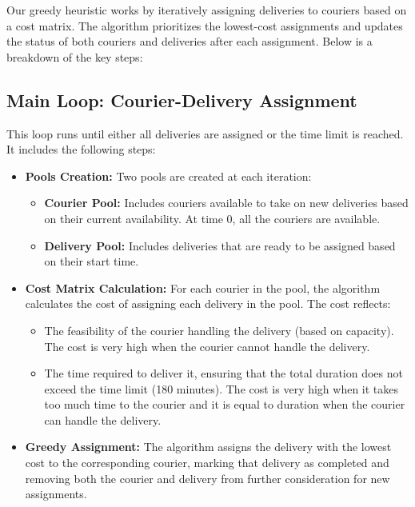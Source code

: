 \documentclass[a4paper]{article}
\begin{document}
%
Our greedy heuristic works by iteratively assigning deliveries to couriers based on a cost matrix. The algorithm prioritizes the lowest-cost assignments and updates the status of both couriers and deliveries after each assignment. Below is a breakdown of the key steps:

\subsection{Main Loop: Courier-Delivery Assignment}
This loop runs until either all deliveries are assigned or the time limit is reached. It includes the following steps:
\begin{itemize}
    \item \textbf{Pools Creation:} Two pools are created at each iteration:
    \begin{itemize}
        \item \textbf{Courier Pool:} Includes couriers available to take on new deliveries based on their current availability. At time 0, all the couriers are available.
        \item \textbf{Delivery Pool:} Includes deliveries that are ready to be assigned based on their start time.
    \end{itemize}
    \item \textbf{Cost Matrix Calculation:} For each courier in the pool, the algorithm calculates the cost of assigning each delivery in the pool. The cost reflects:
    \begin{itemize}
        \item The feasibility of the courier handling the delivery (based on capacity). The cost is very high when the courier cannot handle the delivery.
        \item The time required to deliver it, ensuring that the total duration does not exceed the time limit (180 minutes). The cost is very high when it takes too much time to the courier and it is equal to duration when the courier can handle the delivery.
    \end{itemize}
    \item \textbf{Greedy Assignment:} The algorithm assigns the delivery with the lowest cost to the corresponding courier, marking that delivery as completed and removing both the courier and delivery from further consideration for new assignments.
\end{itemize}
\end{document}
